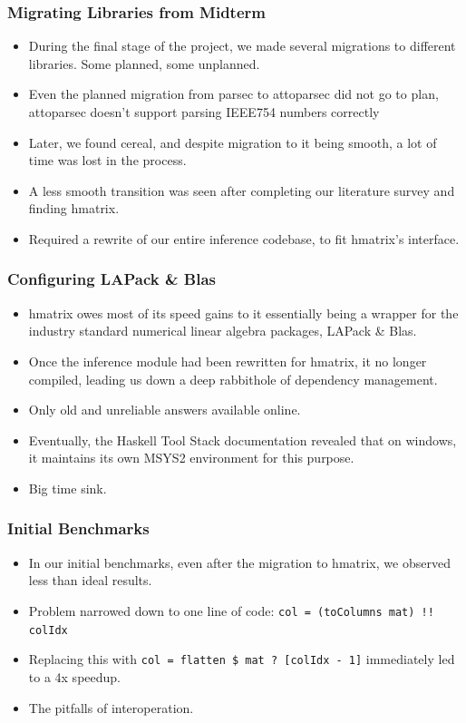 \documentclass{beamer}
\begin{document}
\begin{frame}
  \frametitle{Migrating Libraries from Midterm}

  \begin{itemize}
    \item During the final stage of the project, we made several migrations to different libraries. Some planned, some unplanned.
    \item Even the planned migration from parsec to attoparsec did not go to plan, attoparsec doesn't support parsing IEEE754 numbers correctly
    \item Later, we found cereal, and despite migration to it being smooth, a lot of time was lost in the process.
    \item<2-> A less smooth transition was seen after completing our literature survey and finding hmatrix.
    \item<2-> Required a rewrite of our entire inference codebase, to fit hmatrix's interface.
  \end{itemize}
\end{frame}

\begin{frame}
  \frametitle{Configuring LAPack \& Blas}

  \begin{itemize}
    \item hmatrix owes most of its speed gains to it essentially being a wrapper for the industry standard numerical linear algebra packages, LAPack \& Blas.
    \item Once the inference module had been rewritten for hmatrix, it no longer compiled, leading us down a deep rabbithole of dependency management.
    \item Only old and unreliable answers available online.
    \item Eventually, the Haskell Tool Stack documentation revealed that on windows, it maintains its own MSYS2 environment for this purpose.
    \item Big time sink.
  \end{itemize}

\end{frame}

\begin{frame}[fragile]
  \frametitle{Initial Benchmarks}

  \begin{itemize}
    \item In our initial benchmarks, even after the migration to hmatrix, we observed less than ideal results.
    \item Problem narrowed down to one line of code: \verb|col = (toColumns mat) !! colIdx|
    \item<2-> Replacing this with \verb|col = flatten $ mat ? [colIdx - 1]| immediately led to a 4x speedup.
    \item<2-> The pitfalls of interoperation.
  \end{itemize}

\end{frame}
\end{document}
